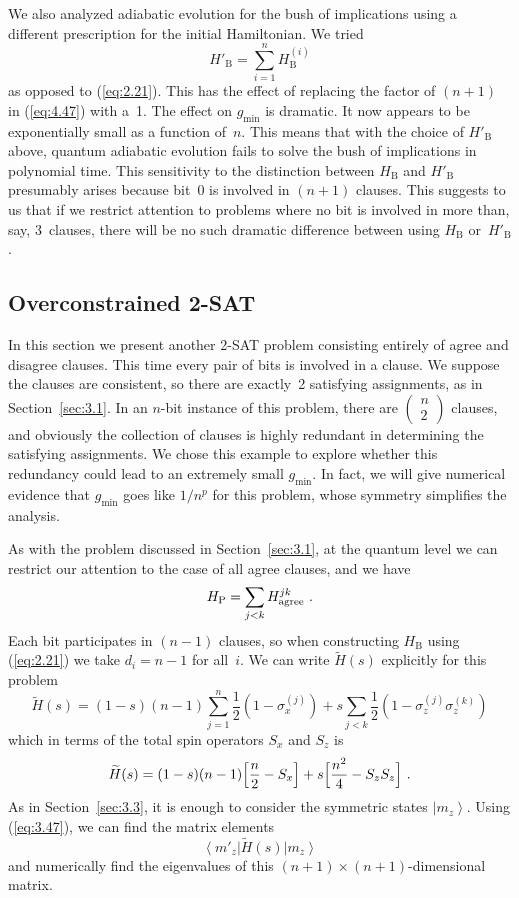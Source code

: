 \documentclass[twoside]{article}
\newcommand{\half}{{\textstyle{\frac12}}}
\newcommand{\ket}[1]{\left|#1\right\rangle}
\newcommand{\bra}[1]{\left\langle#1\right|}
\newcommand{\numEq}[2]{\begin{equation}
   \label{eq:#1}
   #2\end{equation}}
\newcommand{\refEq}[1]{(\ref{eq:#1})}
\newcommand{\rP}{{\mathrm{P}}}
\newcommand{\rB}{{\mathrm{B}}}
\newcommand{\gm}{g_{\min}}
\let\tilde\widetilde
\numberwithin{equation}{section}
\begin{document}
We also analyzed adiabatic evolution for the bush of implications using a
different prescription for the initial Hamiltonian. We tried 
\numEq{4.51}{ H'_\rB = \sum_{i=1}^n H_\rB^{(i)} } as opposed to
\refEq{2.21}. This has the effect of replacing the factor of $(n+1)$ in
\refEq{4.47} with a~1. The effect on $\gm$ is dramatic. It now appears to
be exponentially small as a function of~$n$. This means that with the
choice of $H'_\rB$ above, quantum adiabatic evolution fails to solve the
bush of implications in polynomial time. This sensitivity to the distinction
between $H_\rB$ and $H'_\rB$ presumably arises because bit~0 is
involved in $(n+1)$ clauses. This suggests to us that if we restrict attention
to problems where no bit is involved in more than, say, 3~clauses, there
will be no such dramatic difference between using  $H_\rB$ or~$H'_\rB$.

\subsection{Overconstrained 2-SAT} In this section we present another
2-SAT problem consisting entirely of agree and disagree clauses. This time 
every  pair of bits is involved in a clause. We suppose the clauses are
consistent, so there are exactly~2 satisfying assignments, as in
Section~\ref{sec:3.1}. In an $n$-bit instance of this problem, there are
$\left(\begin{smallmatrix}n\\[0.5ex]2\end{smallmatrix}\right)$ clauses,
and obviously the collection of clauses is highly redundant in determining
the satisfying assignments. We chose this example to explore whether this
redundancy could lead to an  extremely small $\gm$. In fact, we will give
numerical evidence that $\gm$ goes like $1/n^p$ for this problem, whose
symmetry simplifies the analysis. 

 As with the problem discussed in Section~\ref{sec:3.1}, at the quantum
level we can restrict our attention to the case of all agree clauses, and we
have
\numEq{3.48}{ H_\rP=\sum_{j<k} H^{jk}_{\rm agree} \ . } Each bit
participates in $(n-1)$ clauses, so when constructing $H_\rB$ using
\refEq{2.21} we take $d_i=n-1$ for all~$i$.  We can write $\tilde H(s)$
explicitly for this problem
\numEq{3.49}{
\tilde H (s) = (1-s) (n-1)\sum^n_{j=1} \half (1-\sigma_x^{(j)}) +  s
\sum_{j<k}  \half (1-\sigma_z^{(j)} \sigma_z^{(k)}) } which in terms of the
total spin operators $S_x$ and $S_z$ is
\numEq{3.50}{
\tilde H(s) = (1-s) (n-1)\Bigl[\frac{n}{2} -S_x\Bigr] +s \Bigl[\frac{n^2}{4} -
S_zS_z
\Bigr]
\ . } As in Section~\ref{sec:3.3}, it is enough to consider the symmetric
states
$\ket{m_z}$. Using \refEq{3.47}, we can find the matrix elements
\numEq{3.51}{
\bra{m'_z}\tilde H(s) \ket{m_z} } and numerically find the eigenvalues of
this $(n+1)\times(n+1)$-dimensional matrix. 
\end{document}
